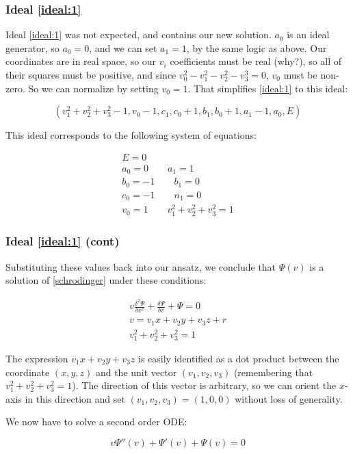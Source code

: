 \documentclass{beamer}
\begin{document}
\begin{frame}
\frametitle{Ideal \eqref{ideal:1}}
Ideal \eqref{ideal:1} was not expected, and contains our new solution.
$a_0$ is an ideal generator,
so $a_0=0$, and we can set $a_1=1$, by the same logic as above.
Our coordinates are in real space, so our $v_i$ coefficients must be real (why?), so all of their squares must
be positive, and since $v_0^2-v_1^2-v_2^2-v_3^3=0$, $v_0$ must be non-zero.  So we can normalize by setting $v_0=1$.
That simplifies \eqref{ideal:1} to this ideal:

\begin{equation}
\left(v_{1}^{2} + v_{2}^{2} + v_{3}^{2} - 1, v_{0} - 1, c_{1}, c_{0} + 1, b_{1}, b_{0} + 1, a_{1} - 1, a_{0}, E\right)
\end{equation}

This ideal corresponds to the following system of equations:

\begin{equation}
\begin{gathered}
E = 0 \\
a_0 = 0 \qquad
a_1 = 1 \\
b_0 = -1 \qquad
b_1 = 0 \\
c_0 = -1 \qquad
n_1 = 0 \\
v_0 = 1 \qquad
v_1^2 + v_2^2 + v_3^2 = 1
\end{gathered}
\end{equation}

\end{frame}

\begin{frame}
\frametitle{Ideal \eqref{ideal:1} (cont)}

Substituting these values back into our ansatz, we conclude that $\Psi(v)$
is a solution of \eqref{schrodinger} under these conditions:

\begin{equation}
\label{related solution}
\begin{gathered}
v \frac{\delta^2\Psi}{\delta v^2} + \frac{\delta\Psi}{\delta v} + \Psi = 0 \\
v = v_1 x+ v_2 y+ v_3 z+r \\
v_1^2 + v_2^2 + v_3^2 = 1
\end{gathered}
\end{equation}

The expression $v_1 x + v_2 y + v_3 z$ is easily identified as a dot product between
the coordinate $(x,y,z)$ and the unit vector $(v_1, v_2, v_3)$ (remembering
that $v_1^2 + v_2^2 + v_3^2 = 1$).  The direction of this vector is arbitrary,
so we can orient the $x$-axis in this direction and set $(v_1, v_2, v_3) = (1,0,0)$
without loss of generality.

We now have to solve a second order ODE:

\begin{equation}
v \Psi''(v) + \Psi'(v) + \Psi(v) = 0
\end{equation}

\end{frame}
\end{document}

